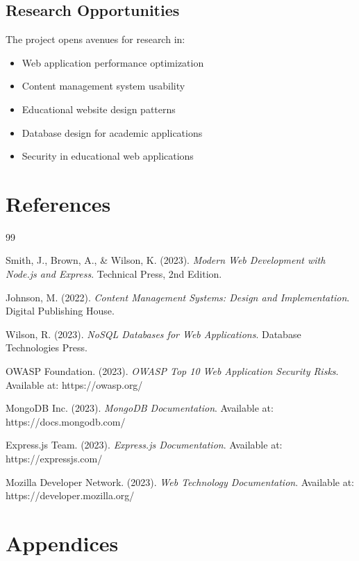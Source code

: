 \documentclass[12pt,a4paper]{report}
\begin{document}
\section{Research Opportunities}
The project opens avenues for research in:
\begin{itemize}
    \item Web application performance optimization
    \item Content management system usability
    \item Educational website design patterns
    \item Database design for academic applications
    \item Security in educational web applications
\end{itemize}

\chapter{References}
\label{chap:references}

\begin{thebibliography}{99}

Smith, J., Brown, A., \& Wilson, K. (2023).
\textit{Modern Web Development with Node.js and Express}.
Technical Press, 2nd Edition.

Johnson, M. (2022).
\textit{Content Management Systems: Design and Implementation}.
Digital Publishing House.

Wilson, R. (2023).
\textit{NoSQL Databases for Web Applications}.
Database Technologies Press.

OWASP Foundation. (2023).
\textit{OWASP Top 10 Web Application Security Risks}.
Available at: https://owasp.org/

MongoDB Inc. (2023).
\textit{MongoDB Documentation}.
Available at: https://docs.mongodb.com/

Express.js Team. (2023).
\textit{Express.js Documentation}.
Available at: https://expressjs.com/

Mozilla Developer Network. (2023).
\textit{Web Technology Documentation}.
Available at: https://developer.mozilla.org/

\end{thebibliography}

\chapter{Appendices}
\label{chap:appendices}
\end{document}
